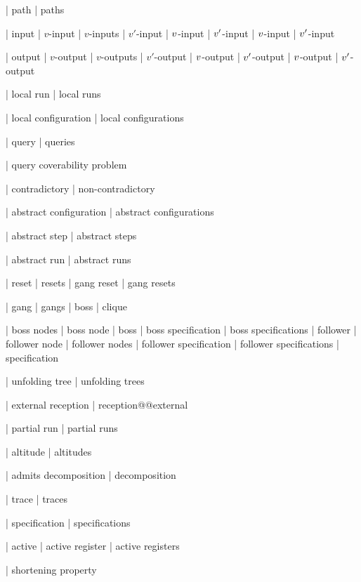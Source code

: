 | path
| paths

| input
| $v$-input
| $v$-inputs
| $v'$-input
| $v$-input
| $v'$-input
| $v$-input
| $v'$-input

| output
| $v$-output
| $v$-outputs
| $v'$-output
| $v$-output
| $v'$-output
| $v$-output
| $v'$-output

| local run
| local runs

| local configuration
| local configurations

| query
| queries

| query coverability problem

| contradictory
| non-contradictory

| abstract configuration
| abstract configurations

| abstract step
| abstract steps


| abstract run
| abstract runs

| reset
| resets
| gang reset
| gang resets



| gang
| gangs
| boss
| clique


| boss nodes
| boss node
| boss
| boss specification
| boss specifications
| follower
| follower node
| follower nodes
| follower specification
| follower specifications
| specification

| unfolding tree
| unfolding trees

| external reception
| reception@@external

| partial run
| partial runs

| altitude
| altitudes

| admits decomposition
| decomposition

| trace
| traces

| specification
| specifications


| active
| active register
| active registers

| shortening property

